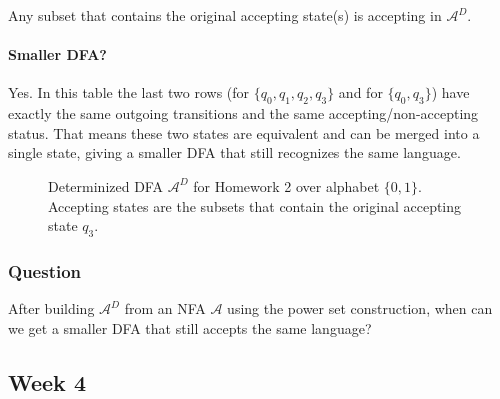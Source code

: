 \documentclass{article}
\theoremstyle{theorem}
\theoremstyle{definition}
\theoremstyle{remark}
\begin{document}
Any subset that contains the original accepting state(s) is accepting in $\mathcal{A}^D$.

\paragraph{Smaller DFA?}
Yes. In this table the last two rows (for $\{q_0,q_1,q_2,q_3\}$ and for $\{q_0,q_3\}$) have exactly the same outgoing transitions and the same accepting/non-accepting status. That means these two states are equivalent and can be merged into a single state, giving a smaller DFA that still recognizes the same language.

\begin{figure}[H]
  \centering
  \caption{Determinized DFA $\mathcal{A}^D$ for Homework 2 over alphabet $\{0,1\}$. Accepting states are the subsets that contain the original accepting state $q_3$.}
  \label{fig:week3hw3}
\end{figure}

\subsubsection*{Question}
After building $\mathcal{A}^D$ from an NFA $\mathcal{A}$ using the power set construction, when can we get a smaller DFA that still accepts the same language? 

\subsection{Week 4}\label{sec:week4}
\end{document}

